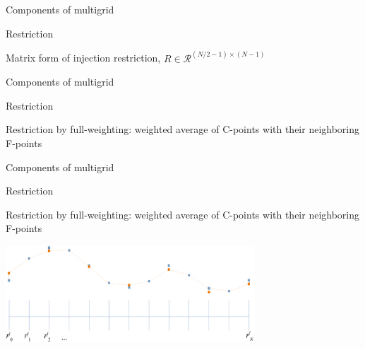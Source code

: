 \documentclass[18pt,xcolor=table]{beamer}
\begin{document}
\begin{frame}{Components of multigrid}
\begin{block}{Restriction}
\bit
\item Matrix form of injection restriction, $R\in\mathcal{R}^{(N/2-1)\times(N-1)}$
\eit
{}
\end{block}
\end{frame}

\begin{frame}{Components of multigrid}
\begin{block}{Restriction}
\bit
\item Restriction by full-weighting: weighted average of C-points with their neighboring F-points
\eit
{}
\end{block}
\end{frame}

\begin{frame}{Components of multigrid}
\begin{block}{Restriction}
\bit
\item Restriction by full-weighting: weighted average of C-points with their neighboring F-points
\eit
\end{block}
\begin{center}
\includegraphics[width=0.7\textwidth]{../figures/fullWeightingResidual}
\end{center}
\end{frame}
\end{document}
